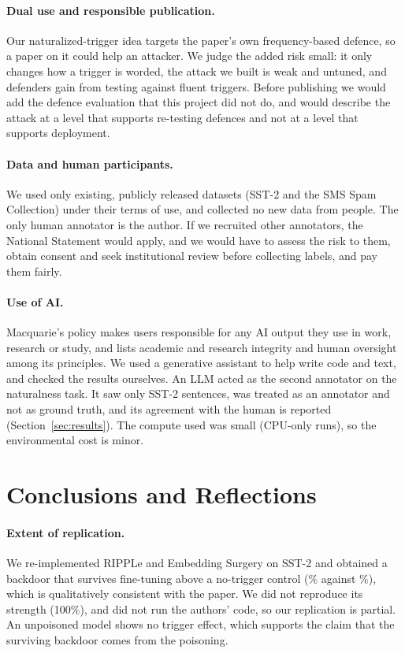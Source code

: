 \documentclass[11pt]{article}
\begin{document}
\paragraph{Dual use and responsible publication.}
Our naturalized-trigger idea targets the paper's own frequency-based defence, so a paper on it could help an attacker. We judge the added risk small: it only changes how a trigger is worded, the attack we built is weak and untuned, and defenders gain from testing against fluent triggers. Before publishing we would add the defence evaluation that this project did not do, and would describe the attack at a level that supports re-testing defences and not at a level that supports deployment.

\paragraph{Data and human participants.}
We used only existing, publicly released datasets (SST-2 and the SMS Spam Collection) under their terms of use, and collected no new data from people. The only human annotator is the author. If we recruited other annotators, the National Statement \citep{natstatement2025} would apply, and we would have to assess the risk to them, obtain consent and seek institutional review before collecting labels, and pay them fairly.

\paragraph{Use of AI.}
Macquarie's policy \citep{mqai} makes users responsible for any AI output they use in work, research or study, and lists academic and research integrity and human oversight among its principles. We used a generative assistant to help write code and text, and checked the results ourselves. An LLM acted as the second annotator on the naturalness task. It saw only SST-2 sentences, was treated as an annotator and not as ground truth, and its agreement with the human is reported (Section~\ref{sec:results}). The compute used was small (CPU-only runs), so the environmental cost is minor.

\section{Conclusions and Reflections}
\label{sec:conclusion}

\paragraph{Extent of replication.}
We re-implemented RIPPLe and Embedding Surgery on SST-2 and obtained a backdoor that survives fine-tuning above a no-trigger control (\rAPostNaive\% against \rAPostCtl\%), which is qualitatively consistent with the paper. We did not reproduce its strength (100\%), and did not run the authors' code, so our replication is partial. An unpoisoned model shows no trigger effect, which supports the claim that the surviving backdoor comes from the poisoning.
\end{document}
